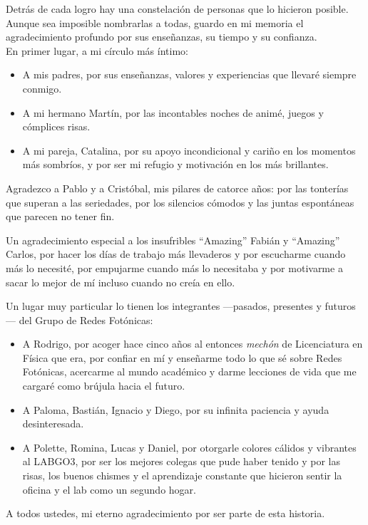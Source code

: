 \documentclass[hyphens]{umemoria}
\begin{document}
\begin{thanks}
Detrás de cada logro hay una constelación de personas que lo hicieron posible. Aunque sea imposible nombrarlas a todas, guardo en mi memoria el agradecimiento profundo por sus enseñanzas, su tiempo y su confianza. \\

En primer lugar, a mi círculo más íntimo:
\begin{itemize}
\item A mis padres, por sus enseñanzas, valores y experiencias que llevaré siempre conmigo.
\item A mi hermano Martín, por las incontables noches de animé, juegos y cómplices risas.
\item A mi pareja, Catalina, por su apoyo incondicional y cariño en los momentos más sombríos, y por ser mi refugio y motivación en los más brillantes.
\end{itemize}
Agradezco a Pablo y a Cristóbal, mis pilares de catorce años: por las tonterías que superan a las seriedades, por los silencios cómodos y las juntas espontáneas que parecen no tener fin. 

Un agradecimiento especial a los insufribles ``Amazing'' Fabián y ``Amazing'' Carlos, por hacer los días de trabajo más llevaderos y por escucharme cuando más lo necesité, por empujarme cuando más lo necesitaba y por motivarme a sacar lo mejor de mí incluso cuando no creía en ello.

Un lugar muy particular lo tienen los integrantes —pasados, presentes y futuros— del Grupo de Redes Fotónicas:
\begin{itemize}
\item A Rodrigo, por acoger hace cinco años al entonces \textit{mechón} de Licenciatura en Física que era, por confiar en mí y enseñarme todo lo que sé sobre Redes Fotónicas, acercarme al mundo académico y darme lecciones de vida que me cargaré como brújula hacia el futuro.
\item A Paloma, Bastián, Ignacio y Diego, por su infinita paciencia y ayuda desinteresada.
\item A Polette, Romina, Lucas y Daniel, por otorgarle colores cálidos y vibrantes al LABGO3, por ser los mejores colegas que pude haber tenido y por las risas, los buenos chismes y el aprendizaje constante que hicieron sentir la oficina y el lab como un segundo hogar.
\end{itemize}
A todos ustedes, mi eterno agradecimiento por ser parte de esta historia.
\end{thanks}
\end{document}
